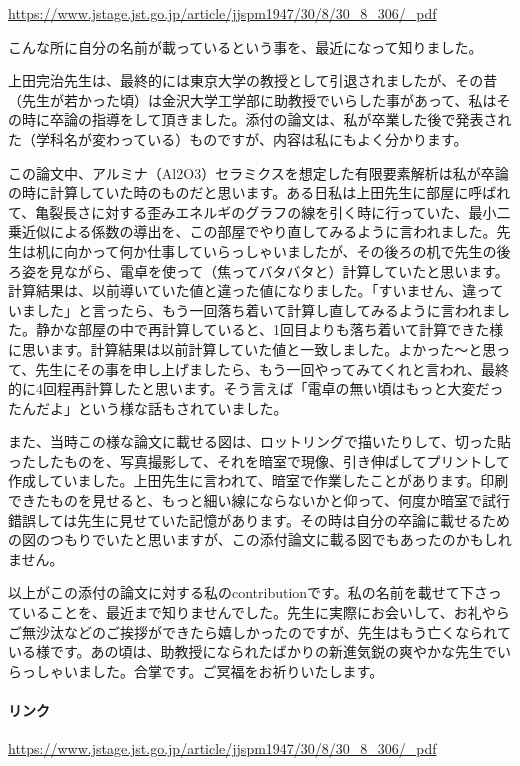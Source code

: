 \url{https://www.jstage.jst.go.jp/article/jjspm1947/30/8/30_8_306/_pdf}

こんな所に自分の名前が載っているという事を、最近になって知りました。

上田完治先生は、最終的には東京大学の教授として引退されましたが、その昔（先生が若かった頃）は金沢大学工学部に助教授でいらした事があって、私はその時に卒論の指導をして頂きました。添付の論文は、私が卒業した後で発表された（学科名が変わっている）ものですが、内容は私にもよく分かります。

この論文中、アルミナ（Al2O3）セラミクスを想定した有限要素解析は私が卒論の時に計算していた時のものだと思います。ある日私は上田先生に部屋に呼ばれて、亀裂長さに対する歪みエネルギのグラフの線を引く時に行っていた、最小二乗近似による係数の導出を、この部屋でやり直してみるように言われました。先生は机に向かって何か仕事していらっしゃいましたが、その後ろの机で先生の後ろ姿を見ながら、電卓を使って（焦ってバタバタと）計算していたと思います。計算結果は、以前導いていた値と違った値になりました。「すいません、違っていました」と言ったら、もう一回落ち着いて計算し直してみるように言われました。静かな部屋の中で再計算していると、1回目よりも落ち着いて計算できた様に思います。計算結果は以前計算していた値と一致しました。よかった〜と思って、先生にその事を申し上げましたら、もう一回やってみてくれと言われ、最終的に4回程再計算したと思います。そう言えば「電卓の無い頃はもっと大変だったんだよ」という様な話もされていました。

また、当時この様な論文に載せる図は、ロットリングで描いたりして、切った貼ったしたものを、写真撮影して、それを暗室で現像、引き伸ばしてプリントして作成していました。上田先生に言われて、暗室で作業したことがあります。印刷できたものを見せると、もっと細い線にならないかと仰って、何度か暗室で試行錯誤しては先生に見せていた記憶があります。その時は自分の卒論に載せるための図のつもりでいたと思いますが、この添付論文に載る図でもあったのかもしれません。

以上がこの添付の論文に対する私のcontributionです。私の名前を載せて下さっていることを、最近まで知りませんでした。先生に実際にお会いして、お礼やらご無沙汰などのご挨拶ができたら嬉しかったのですが、先生はもう亡くなられている様です。あの頃は、助教授になられたばかりの新進気鋭の爽やかな先生でいらっしゃいました。合掌です。ご冥福をお祈りいたします。

\paragraph{リンク}
\url{https://www.jstage.jst.go.jp/article/jjspm1947/30/8/30_8_306/_pdf}

